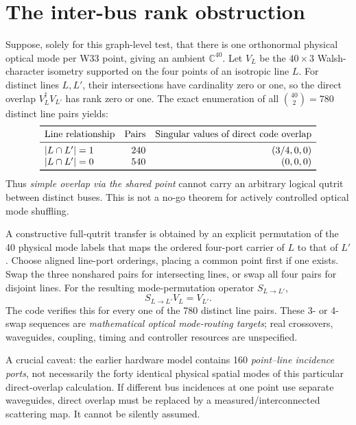 \documentclass[10pt]{article}
\begin{document}
\section{The inter-bus rank obstruction}
Suppose, solely for this graph-level test, that there
is one orthonormal physical optical mode per W33 point,
giving an ambient $\mathbb C^{40}$. Let $V_L$ be the
$40\times3$ Walsh-character isometry supported on the
four points of an isotropic line $L$.
For distinct lines $L,L'$, their intersections have
cardinality zero or one, so the direct overlap
$V_L^\dagger V_{L'}$ has rank zero or one.
The exact enumeration of all $\binom{40}{2}=780$
distinct line pairs yields:
\[
\begin{array}{lrr}
\toprule
\text{Line relationship}&\text{Pairs}&
 \text{Singular values of direct code overlap}\\
\midrule
|L\cap L'|=1&240&(3/4,0,0)\\
|L\cap L'|=0&540&(0,0,0)\\
\bottomrule
\end{array}
\]
Thus \emph{simple overlap via the shared point}
cannot carry an arbitrary logical qutrit between
distinct buses. This is not a no-go theorem for
actively controlled optical mode shuffling.

A constructive full-qutrit transfer is obtained
by an explicit permutation of the 40 physical
mode labels that maps the ordered four-port
carrier of $L$ to that of $L'$. Choose aligned
line-port orderings, placing a common point first
if one exists. Swap the three nonshared pairs
for intersecting lines, or swap all four pairs
for disjoint lines. For the resulting mode-permutation
operator $S_{L\to L'}$,
\[
 S_{L\to L'}V_L=V_{L'}.
\]
The code verifies this for every one of the
780 distinct line pairs. These 3- or 4-swap
sequences are \emph{mathematical optical
mode-routing targets}; real crossovers,
waveguides, coupling, timing and controller
resources are unspecified.

A crucial caveat: the earlier hardware model
contains 160 \emph{point--line incidence ports},
not necessarily the forty identical physical
spatial modes of this particular direct-overlap
calculation. If different bus incidences at one
point use separate waveguides, direct overlap
must be replaced by a measured/interconnected
scattering map. It cannot be silently assumed.
\end{document}
